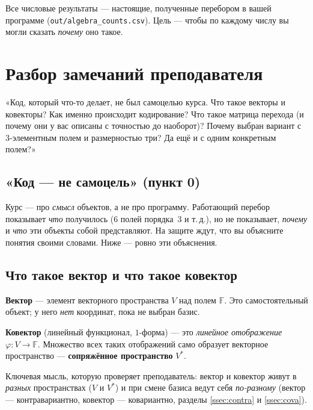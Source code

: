 \documentclass[11pt]{article}
\newcommand{\F}{\mathbb{F}}
\begin{document}
Все числовые результаты — настоящие, полученные перебором в вашей программе
(\texttt{out/\allowbreak algebra\_\allowbreak counts.csv}). Цель — чтобы по каждому числу вы могли сказать
\emph{почему} оно такое.

\section{Разбор замечаний преподавателя}

\begin{warnbox}
«Код, который что-то делает, не был самоцелью курса. Что такое векторы и ковекторы?
Как именно происходит кодирование? Что такое матрица перехода (и почему они у вас
описаны с точностью до наоборот)? Почему выбран вариант с 3-элементным полем и
размерностью три? Да ещё и с одним конкретным полем?»
\end{warnbox}

\subsection{«Код — не самоцель» (пункт 0)}

Курс — про \emph{смысл} объектов, а не про программу. Работающий перебор показывает
\emph{что} получилось ($6$ полей порядка~$3$ и т.\,д.), но не показывает, \emph{почему}
и \emph{что} эти объекты собой представляют. На защите ждут, что вы объясните понятия
своими словами. Ниже — ровно эти объяснения.

\subsection{Что такое вектор и что такое ковектор}

\begin{idea}[Определения]
\textbf{Вектор} — элемент векторного пространства $V$ над полем $\F$. Это
самостоятельный объект; у него \emph{нет} координат, пока не выбран базис.

\textbf{Ковектор} (линейный функционал, $1$-форма) — это \emph{линейное отображение}
$\varphi\colon V \to \F$. Множество всех таких отображений само образует векторное
пространство — \textbf{сопряжённое пространство} $V^{*}$.
\end{idea}

Ключевая мысль, которую проверяет преподаватель: вектор и ковектор живут в
\emph{разных} пространствах ($V$ и $V^{*}$) и при смене базиса ведут себя
\emph{по-разному} (вектор — контравариантно, ковектор — ковариантно, разделы
\ref{ssec:contra} и \ref{ssec:cova}).
\end{document}
